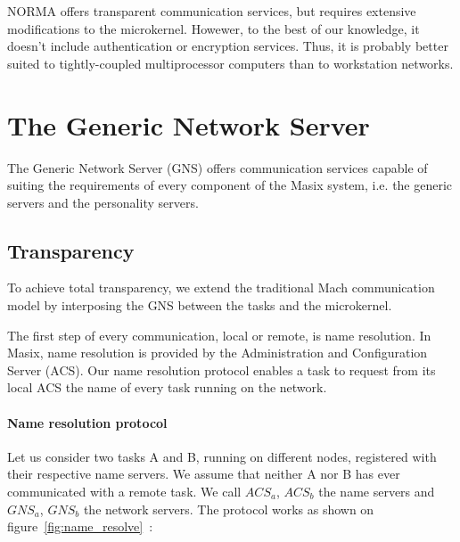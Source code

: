NORMA offers transparent communication services, but requires extensive 
modifications to the microkernel. Howewer, to the best of our knowledge, it
 doesn't include authentication or encryption services. Thus, it is 
probably better suited to tightly-coupled multiprocessor computers than to
 workstation networks.

\section {The Generic Network Server}

The Generic Network Server (GNS) offers communication services capable of 
suiting the requirements of every component of the Masix system, i.e. the 
generic servers and the personality servers.

\subsection{Transparency}

To achieve total transparency, we extend the traditional Mach 
communication model by interposing the GNS between the tasks and 
the microkernel.

The first step of every communication, local or remote, is name resolution. 
In Masix, name resolution is provided by the Administration and 
Configuration Server (ACS).
Our name resolution protocol enables a task 
to request from its local ACS the name of every task running on the
 network.

\paragraph{Name resolution protocol}

Let us consider two tasks A and B, running on different nodes,  
registered with their respective name servers. 
We assume that neither A nor B has ever communicated with a remote task.
We call \(ACS_{a}\), \(ACS_{b}\) the name servers and \(GNS_{a}\), \(GNS_{b}\) the 
network servers.
The protocol works as shown on figure~\ref{fig:name_resolve}~:


